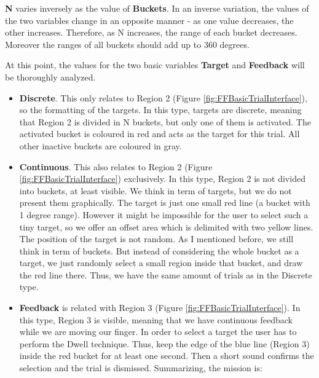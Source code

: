 \textbf{N} varies inversely as the value of \textbf{Buckets}. In an inverse variation, the values of the two variables change in an opposite manner - as one value decreases, the other increases. Therefore, as N increases, the range of each bucket decreases. Moreover the ranges of all buckets should add up to 360 degrees. 

At this point, the values for the two basic variables \textbf{Target} and \textbf{Feedback} will be thoroughly analyzed.




\begin{itemize}
	\item \textbf{Discrete}. This only relates to Region 2 (Figure \ref{fig:FFBasicTrialInterface}), so the formatting of the targets. In this type, targets are discrete, meaning that Region 2 is divided in N buckets, but only one of them is activated. The activated bucket is coloured in red and acts as the target for this trial. All other inactive buckets are coloured in gray. 

	\item \textbf{Continuous}. This also relates to Region 2 (Figure \ref{fig:FFBasicTrialInterface}) exclusively. In this type, Region 2 is not divided into buckets, at least visible. We think in term of targets, but we do not present them graphically. The target is just one small red line (a bucket with 1 degree range). However it might be impossible for the user to select such a tiny target, so we offer an offset area which is delimited with two yellow lines. The position of the target is not random. As I mentioned before, we still think in term of buckets. But instead of considering the whole bucket as a target, we just randomly select a small region inside that bucket, and draw the red line there. Thus, we have the same amount of trials as in the Discrete type.

	\item \textbf{Feedback} is related with Region 3 (Figure \ref{fig:FFBasicTrialInterface}). In this type, Region 3 is visible, meaning that we have continuous feedback while we are moving our finger. In order to select a target the user has to perform the Dwell technique. Thus, keep the edge of the blue line (Region 3) inside the red bucket for at least one second. Then a short sound confirms the selection and the trial is dismissed. Summarizing, the mission is: 


\end{itemize}
